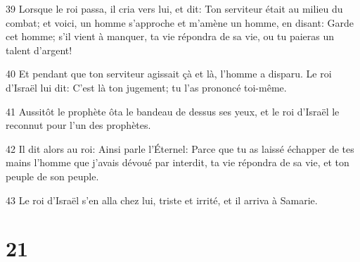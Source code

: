 \par 39 Lorsque le roi passa, il cria vers lui, et dit: Ton serviteur était au milieu du combat; et voici, un homme s'approche et m'amène un homme, en disant: Garde cet homme; s'il vient à manquer, ta vie répondra de sa vie, ou tu paieras un talent d'argent!
\par 40 Et pendant que ton serviteur agissait çà et là, l'homme a disparu. Le roi d'Israël lui dit: C'est là ton jugement; tu l'as prononcé toi-même.
\par 41 Aussitôt le prophète ôta le bandeau de dessus ses yeux, et le roi d'Israël le reconnut pour l'un des prophètes.
\par 42 Il dit alors au roi: Ainsi parle l'Éternel: Parce que tu as laissé échapper de tes mains l'homme que j'avais dévoué par interdit, ta vie répondra de sa vie, et ton peuple de son peuple.
\par 43 Le roi d'Israël s'en alla chez lui, triste et irrité, et il arriva à Samarie.

\chapter{21}

